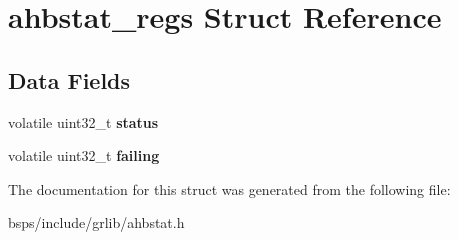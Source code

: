 \hypertarget{structahbstat__regs}{}\section{ahbstat\+\_\+regs Struct Reference}
\label{structahbstat__regs}
\subsection*{Data Fields}
\begin{DoxyCompactItemize}
\item 
\mbox{\label{structahbstat__regs_a6b7c2a7da3baa15d7771963337daa093}} 
volatile uint32\+\_\+t {\bfseries status}
\item 
\mbox{\label{structahbstat__regs_af8fe12ae8924c4416d8897f9b45c02db}} 
volatile uint32\+\_\+t {\bfseries failing}
\end{DoxyCompactItemize}


The documentation for this struct was generated from the following file\+:\begin{DoxyCompactItemize}
\item 
bsps/include/grlib/ahbstat.\+h\end{DoxyCompactItemize}
